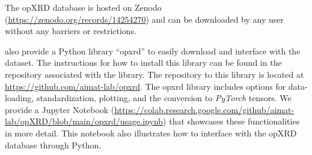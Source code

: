 The opXRD database is hosted on Zenodo (\url{https://zenodo.org/records/14254270}) and can be downloaded by any user without any barriers or restrictions.

 also provide a Python library ``opxrd'' to easily download and interface with the dataset.
The instructions for how to install this library can be found in the repository associated with the library. The repository to this library is located at \url{https://github.com/aimat-lab/opxrd}. The opxrd library includes options for data-loading, standardization, plotting, and the conversion to \emph{PyTorch} tensors. We provide a Jupyter Notebook (\url{https://colab.research.google.com/github/aimat-lab/opXRD/blob/main/opxrd/usage.ipynb})
that showcases these functionalities in more detail. This notebook also illustrates how to interface with the opXRD database through Python. 